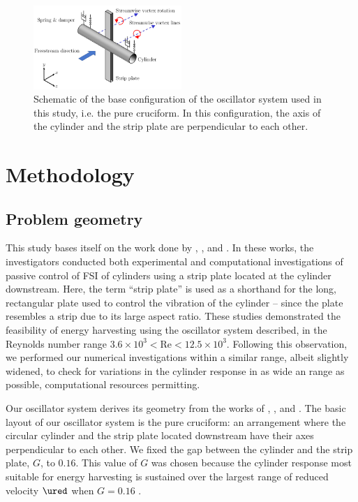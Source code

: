 \documentclass[a4paper,fleqn]{cas-sc}
\begin{document}
\begin{figure}
  \centering
  \includegraphics[width=0.5\textwidth]{figs/oscillatorSchematic}
  \caption{Schematic of the base configuration of the oscillator system used in this study, i.e. the pure cruciform. In this configuration, the axis of the cylinder and the strip plate are perpendicular to each other.}
  \label{fig:oscillatorSchematic}
\end{figure}

\section{Methodology} \label{sec:method}
\subsection{Problem geometry} \label{ssec:probGeo}
This study bases itself on the work done by \citet{Maruai2017}, \citet{Maruai2018}, and \citet{Koide2013}. In these works, the investigators conducted both experimental and computational investigations of passive control of FSI of cylinders using a strip plate located at the cylinder downstream. Here, the term ``strip plate'' is used as a shorthand for the long, rectangular plate used to control the vibration of the cylinder -- since the plate resembles a strip due to its large aspect ratio. These studies demonstrated the feasibility of energy harvesting using the oscillator system described, in the Reynolds number range $3.6\times10^{3}<\text{Re}<12.5\times10^{3}$. Following this observation, we performed our numerical investigations within a similar \re{} range, albeit slightly widened, to check for variations in the cylinder response in as wide an \re{} range as possible, computational resources permitting.

Our oscillator system derives its geometry from the works of \citet{Nguyen2012}, \citet{Koide2013}, and \citet{Koide2017}. The basic layout of our oscillator system is the pure cruciform: an arrangement where the circular cylinder and the strip plate located downstream have their axes perpendicular to each other. We fixed the gap between the cylinder and the strip plate, $G$, to $0.16$. This value of $G$ was chosen because the cylinder response most suitable for energy harvesting is sustained over the largest range of reduced velocity $\ured$ when $G = 0.16$ \citep{Koide2013}.
\end{document}
